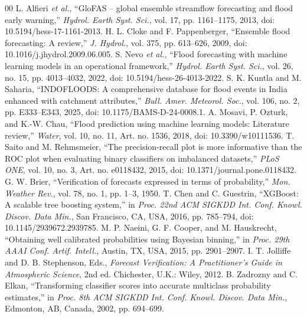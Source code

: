 \documentclass[conference]{IEEEtran}
\begin{document}
\begin{thebibliography}{00}
 L. Alfieri \textit{et al.}, ``GloFAS -- global ensemble streamflow forecasting and flood early warning,'' \textit{Hydrol. Earth Syst. Sci.}, vol. 17, pp. 1161--1175, 2013, doi: 10.5194/hess-17-1161-2013.
 H. L. Cloke and F. Pappenberger, ``Ensemble flood forecasting: A review,'' \textit{J. Hydrol.}, vol. 375, pp. 613--626, 2009, doi: 10.1016/j.jhydrol.2009.06.005.
 S. Nevo \textit{et al.}, ``Flood forecasting with machine learning models in an operational framework,'' \textit{Hydrol. Earth Syst. Sci.}, vol. 26, no. 15, pp. 4013--4032, 2022, doi: 10.5194/hess-26-4013-2022.
 S. K. Kuntla and M. Saharia, ``INDOFLOODS: A comprehensive database for flood events in India enhanced with catchment attributes,'' \textit{Bull. Amer. Meteorol. Soc.}, vol. 106, no. 2, pp. E333--E343, 2025, doi: 10.1175/BAMS-D-24-0008.1.
 A. Mosavi, P. Ozturk, and K.-W. Chau, ``Flood prediction using machine learning models: Literature review,'' \textit{Water}, vol. 10, no. 11, Art. no. 1536, 2018, doi: 10.3390/w10111536.
 T. Saito and M. Rehmsmeier, ``The precision-recall plot is more informative than the ROC plot when evaluating binary classifiers on imbalanced datasets,'' \textit{PLoS ONE}, vol. 10, no. 3, Art. no. e0118432, 2015, doi: 10.1371/journal.pone.0118432.
 G. W. Brier, ``Verification of forecasts expressed in terms of probability,'' \textit{Mon. Weather Rev.}, vol. 78, no. 1, pp. 1--3, 1950.
 T. Chen and C. Guestrin, ``XGBoost: A scalable tree boosting system,'' in \textit{Proc. 22nd ACM SIGKDD Int. Conf. Knowl. Discov. Data Min.}, San Francisco, CA, USA, 2016, pp. 785--794, doi: 10.1145/2939672.2939785.
 M. P. Naeini, G. F. Cooper, and M. Hauskrecht, ``Obtaining well calibrated probabilities using Bayesian binning,'' in \textit{Proc. 29th AAAI Conf. Artif. Intell.}, Austin, TX, USA, 2015, pp. 2901--2907.
 I. T. Jolliffe and D. B. Stephenson, Eds., \textit{Forecast Verification: A Practitioner's Guide in Atmospheric Science}, 2nd ed. Chichester, U.K.: Wiley, 2012.
 B. Zadrozny and C. Elkan, ``Transforming classifier scores into accurate multiclass probability estimates,'' in \textit{Proc. 8th ACM SIGKDD Int. Conf. Knowl. Discov. Data Min.}, Edmonton, AB, Canada, 2002, pp. 694--699.
\end{thebibliography}
\end{document}
